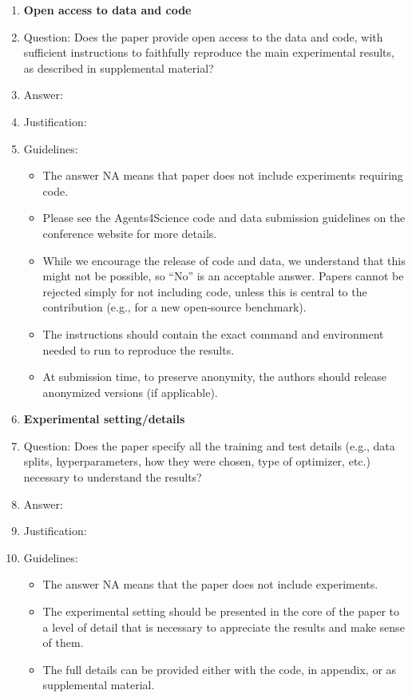 \documentclass{article}
\begin{document}
\begin{enumerate}
\item {\bf Open access to data and code}
    \item[] Question: Does the paper provide open access to the data and code, with sufficient instructions to faithfully reproduce the main experimental results, as described in supplemental material?
    \item[] Answer: \answerTODO{} %
    \item[] Justification: \justificationTODO{}
    \item[] Guidelines:
    \begin{itemize}
        \item The answer NA means that paper does not include experiments requiring code.
        \item Please see the Agents4Science code and data submission guidelines on the conference website for more details.
        \item While we encourage the release of code and data, we understand that this might not be possible, so “No” is an acceptable answer. Papers cannot be rejected simply for not including code, unless this is central to the contribution (e.g., for a new open-source benchmark).
        \item The instructions should contain the exact command and environment needed to run to reproduce the results. 
        \item At submission time, to preserve anonymity, the authors should release anonymized versions (if applicable).
    \end{itemize}

\item {\bf Experimental setting/details}
    \item[] Question: Does the paper specify all the training and test details (e.g., data splits, hyperparameters, how they were chosen, type of optimizer, etc.) necessary to understand the results?
    \item[] Answer: \answerTODO{} %
    \item[] Justification: \justificationTODO{}
    \item[] Guidelines:
    \begin{itemize}
        \item The answer NA means that the paper does not include experiments.
        \item The experimental setting should be presented in the core of the paper to a level of detail that is necessary to appreciate the results and make sense of them.
        \item The full details can be provided either with the code, in appendix, or as supplemental material.
    \end{itemize}


\end{enumerate}
\end{document}
